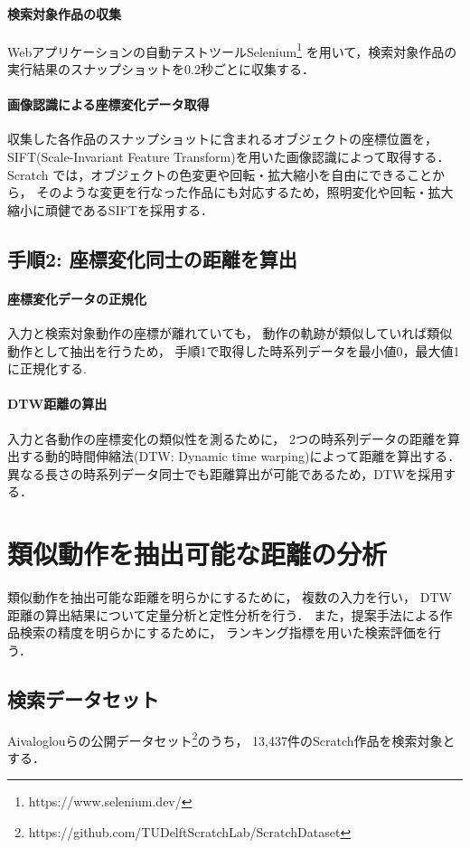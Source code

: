 \documentclass[twocolumn]{jarticle} %
\begin{document}
\paragraph{検索対象作品の収集}
Webアプリケーションの自動テストツールSelenium\footnote{https://www.selenium.dev/}
を用いて，検索対象作品の実行結果のスナップショットを0.2秒ごとに収集する．
\paragraph{画像認識による座標変化データ取得}
収集した各作品のスナップショットに含まれるオブジェクトの座標位置を，
SIFT(Scale-Invariant Feature Transform)を用いた画像認識によって取得する．
Scratch では，オブジェクトの色変更や回転・拡大縮小を自由にできることから，
そのような変更を行なった作品にも対応するため，照明変化や回転・拡大縮小に頑健であるSIFTを採用する．

\subsection{手順2: 座標変化同士の距離を算出}
\paragraph{座標変化データの正規化}
入力と検索対象動作の座標が離れていても，
動作の軌跡が類似していれば類似動作として抽出を行うため，
手順1で取得した時系列データを最小値0，最大値1に正規化する.

\paragraph{DTW距離の算出}
入力と各動作の座標変化の類似性を測るために，
2つの時系列データの距離を算出する動的時間伸縮法(DTW: Dynamic time warping)によって距離を算出する．
異なる長さの時系列データ同士でも距離算出が可能であるため，DTWを採用する．

\section{類似動作を抽出可能な距離の分析}\label{chap:fig-tab-exp}
類似動作を抽出可能な距離を明らかにするために，
複数の入力を行い，
DTW距離の算出結果について定量分析と定性分析を行う．
また，提案手法による作品検索の精度を明らかにするために，
ランキング指標を用いた検索評価を行う．

\subsection{検索データセット}
Aivaloglouらの公開データセット\footnote{https://github.com/TUDelftScratchLab/ScratchDataset}のうち，
13,437件のScratch作品を検索対象とする．
\end{document}
